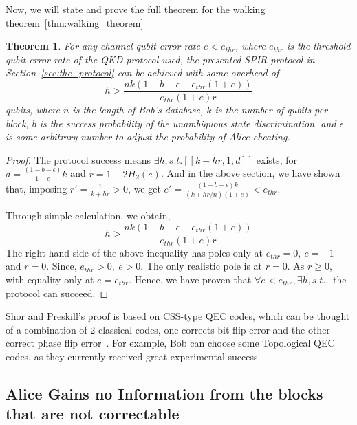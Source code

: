 \documentclass[%
 reprint,
superscriptaddress,
 amsmath,amssymb,
 aps,
]{revtex4-2}
\newtheorem{theorem}{Theorem}[section]
\begin{document}
Now, we will state and prove the full theorem for the walking theorem~\ref{thm:walking_theorem}

\begin{theorem}
    For any channel qubit error rate $e<e_{thr}$, where $e_{thr}$ is the threshold qubit error rate of the QKD protocol used, the presented SPIR protocol in Section~\ref{sec:the_protocol} can be achieved with some overhead of
    \begin{equation}
        h >\frac{nk(1-b-\epsilon-e_{thr}(1+e))}{e_{thr}(1+e)r}
    \end{equation} qubits, where $n$ is the length of Bob's database, $k$ is the number of qubits per block, $b$ is the success probability of the unambiguous state discrimination, and $\epsilon$ is some arbitrary number to adjust the probability of Alice cheating.
\label{thm:success_protocol}
\end{theorem}

\begin{proof}
    The protocol success means $\exists h, s.t. [[k+hr, 1, d]]$ exists, for $d=\frac{(1-b-\epsilon)}{1+e}k$ and $r=1-2H_2(e)$. And in the above section, we have shown that, imposing $r'=\frac{1}{k+hr}>0$, we get $e'=\frac{(1-b-\epsilon)k}{(k+hr/n)(1+e)}<e_{thr}$.

    Through simple calculation, we obtain,
    \begin{equation}
         h>\frac{nk(1-b-\epsilon-e_{thr}(1+e))}{e_{thr}(1+e)r}
    \end{equation}
    The right-hand side of the above inequality has poles only at $e_{thr}=0,\ e=-1$ and $r=0$. Since, $e_{thr}>0,\ e>0$. The only realistic pole is at $r=0$. As $r\ge0$, with equality only at $e=e_{thr}$. Hence, we have proven that $\forall e<e_{thr}, \exists h, s.t.,$ the protocol can succeed.
\end{proof}

Shor and Preskill's proof is based on CSS-type QEC codes, which can be thought of a combination of 2 classical codes, one corrects bit-flip error and the other correct phase flip error~\cite{CSS_Shor_Calderbank, CSS_Steane, Shors_9_qubits_code}. For example, Bob can choose some Topological QEC codes, as they currently received great experimental success~\cite{Surfacecode1, google_surface_code, TQEC1}

\subsection{Alice Gains no Information from the blocks that are not correctable}
\end{document}
